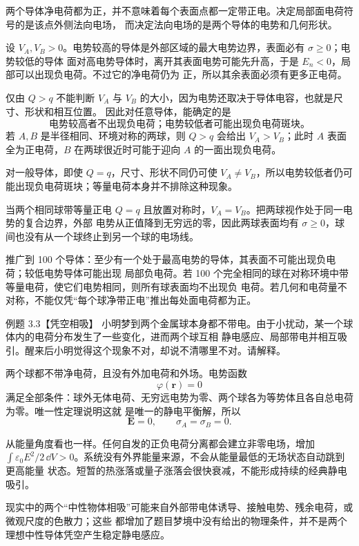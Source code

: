 \begin{xesolution}
两个导体净电荷都为正，并不意味着每个表面点都一定带正电。决定局部面电荷符号的是该点外侧法向电场，
而决定法向电场的是两个导体的电势和几何形状。

设 $V_A,V_B>0$。电势较高的导体是外部区域的最大电势边界，表面必有 $\sigma\ge0$；电势较低的导体
面对高电势导体时，离开其表面电势可能先升高，于是 $E_n<0$，局部可以出现负电荷。不过它的净电荷仍为
正，所以其余表面必须有更多正电荷。

仅由 $Q>q$ 不能判断 $V_A$ 与 $V_B$ 的大小，因为电势还取决于导体电容，也就是尺寸、形状和相互位置。
因此对任意导体，能确定的是
\[
  \boxed{\text{电势较高者不出现负电荷；电势较低者可能出现负电荷斑块。}}
\]
若 $A,B$ 是半径相同、环境对称的两球，则 $Q>q$ 会给出 $V_A>V_B$；此时 $A$ 表面全为正电荷，$B$
在两球很近时可能于迎向 $A$ 的一面出现负电荷。

对一般导体，即使 $Q=q$，尺寸、形状不同仍可使 $V_A\ne V_B$，所以电势较低者仍可能出现负电荷斑块；等量电荷本身并不排除这种现象。

当两个相同球带等量正电 $Q=q$ 且放置对称时，$V_A=V_B$。把两球视作处于同一电势的复合边界，外部
电势从正值降到无穷远的零，因此两球表面均有 $\sigma\ge0$，球间也没有从一个球终止到另一个球的电场线。

推广到 100 个导体：至少有一个处于最高电势的导体，其表面不可能出现负电荷；较低电势导体可能出现
局部负电荷。若 100 个完全相同的球在对称环境中带等量电荷，使它们电势相同，则所有球表面均不出现负
电荷。若几何和电荷量不对称，不能仅凭“每个球净带正电”推出每处面电荷都为正。
\end{xesolution}

\begin{origexamplebox}{例题 3.3【凭空相吸】}
小明梦到两个金属球本身都不带电。由于小扰动，某一个球体内的电荷分布发生了一些变化，进而两个球互相
静电感应、局部带电并相互吸引。醒来后小明觉得这个现象不对，却说不清哪里不对。请解释。
\end{origexamplebox}

\begin{xesolution}
两个球都不带净电荷，且没有外加电荷和外场。电势函数
\[
  \varphi(\boldsymbol r)=0
\]
满足全部条件：球外无体电荷、无穷远电势为零、两个球各为等势体且各自总电荷为零。唯一性定理说明这就
是唯一的静电平衡解，所以
\[
  \boxed{\boldsymbol E=0,\qquad \sigma_A=\sigma_B=0}.
\]

从能量角度看也一样。任何自发的正负电荷分离都会建立非零电场，增加
$\int\varepsilon_0E^2/2\,\dd V>0$。系统没有外界能量来源，不会从能量最低的无场状态自动跳到更高能量
状态。短暂的热涨落或量子涨落会很快衰减，不能形成持续的经典静电吸引。

现实中的两个“中性物体相吸”可能来自外部带电体诱导、接触电势、残余电荷，或微观尺度的色散力；这些
都增加了题目梦境中没有给出的物理条件，并不是两个理想中性导体凭空产生稳定静电感应。
\end{xesolution}

